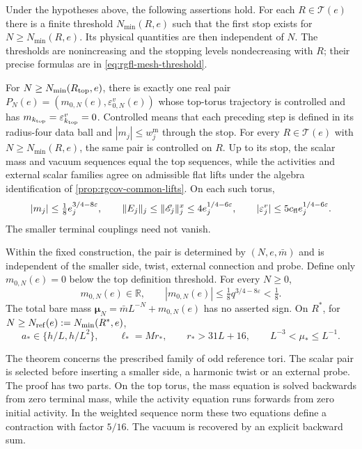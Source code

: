 \begin{theorem}\label{thm:main}
Under the hypotheses above, the following assertions hold.
For each \(R\in\mathcal T(e)\) there is a finite threshold
\(N_{\min}(R,e)\) such that the first stop exists for
\(N\ge N_{\min}(R,e)\). Its physical quantities are then independent
of \(N\). The thresholds are nonincreasing and the stopping levels
nondecreasing
with \(R\); their precise formulas are in \eqref{eq:rgfl-mesh-threshold}.

For \(N\ge N_{\min}(R_{\rm top},e)\), there is exactly one real
pair \(P_N(e)=(m_{0,N}(e),\varepsilon_{0,N}^v(e))\) whose top-torus
trajectory is controlled and has
\(m_{k_{\rm top}}=\varepsilon_{k_{\rm top}}^v=0\).
Controlled means that each preceding step is defined in its
radius-four data ball and \(|m_j|\le w_j^{\mathrm m}\) through the stop.
For every \(R\in\mathcal T(e)\) with \(N\ge N_{\min}(R,e)\),
the same pair is controlled on \(R\). Up to its stop, the scalar
mass and vacuum sequences equal the top sequences, while the
activities and external scalar families agree on admissible flat
lifts under the algebra identification of \cref{prop:rgcov-common-lifts}. On each such torus,
\begin{equation}\label{eq:cv-common-bounds}
 |m_j|\le\tfrac18e_j^{3/4-8\varepsilon},\qquad
 \|E_j\|_j\le\|\mathscr E_j\|_j^x\le4e_j^{1/4-6\varepsilon},\qquad
 |\varepsilon_j^v|\le5c_{\rm fl}e_j^{1/4-6\varepsilon}.
\end{equation}
The smaller terminal couplings need not vanish.

Within the fixed construction, the pair is determined by
\((N,e,\bar m)\) and is independent of the smaller side, twist,
external connection and probe. Define only \(m_{0,N}(e)=0\) below
the top definition threshold. For every \(N\ge0\),
\[
 m_{0,N}(e)\in\mathbb R,\qquad
 |m_{0,N}(e)|\le\tfrac18q^{3/4-8\varepsilon}<\tfrac18 .
\]
The total bare mass \(\boldsymbol\mu_N=\bar mL^{-N}+m_{0,N}(e)\)
has no asserted sign. On \(R^*\), for
\(N\ge N_{\rm ref}(e):=N_{\min}(R^*,e)\),
\[
 a_*\in\{h/L,h/L^2\},\qquad
 \ell_*=Mr_*,\qquad r_*>31L+16,\qquad
 L^{-3}<\mu_*\le L^{-1}.
\]


\end{theorem}

The theorem concerns the prescribed family of odd reference tori.
The scalar pair is selected before inserting a smaller side, a harmonic
twist or an external probe. The proof has two parts. On the top torus,
the mass equation is solved backwards from zero terminal mass, while
the activity equation runs forwards from zero initial activity. In the
weighted sequence norm these two equations define a contraction with
factor \(5/16\). The vacuum is recovered by an explicit backward sum.

